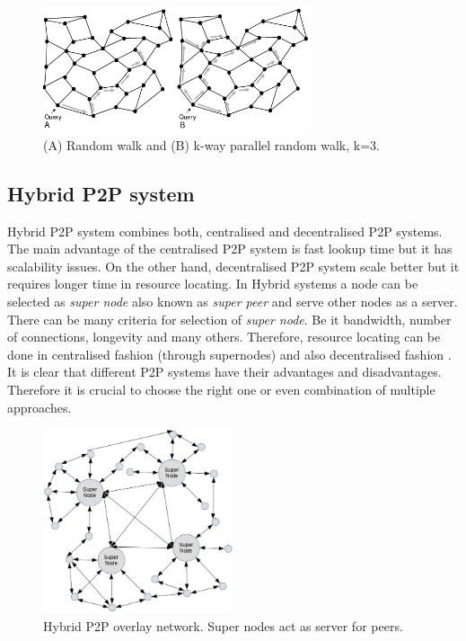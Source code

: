 \begin{figure}[ht]
	\centering
	\includegraphics[width=0.7\textwidth]{images/random-walk-graph.png}
	\caption{\label{fig:random-walk-graph}(A) Random walk and (B) k-way parallel random walk, k=3. \cite{koegel_buford_p2p_2009}}
\end{figure}

\subsection{Hybrid P2P system}
\quad Hybrid P2P system combines both, centralised and decentralised P2P systems. The main advantage of the centralised P2P system is fast lookup time but it has scalability issues. On the other hand, decentralised P2P system scale better but it requires longer time in resource locating. In Hybrid systems a node can be selected as \textit{super node} also known as \textit{super peer} and serve other nodes as a server. There can be many criteria for selection of \textit{super node}. Be it bandwidth, number of connections, longevity and many others. Therefore, resource locating can be done in centralised fashion (through supernodes) and also decentralised fashion \cite{vu_peer--peer_2010}. It is clear that different P2P systems have their advantages and disadvantages. Therefore it is crucial to choose the right one or even combination of multiple approaches.

\begin{figure}[ht]
	\centering
	\includegraphics[width=0.5\textwidth]{images/hybrid-p2p.png}
	\caption{\label{fig:hybrid-p2p} Hybrid P2P overlay network. Super nodes act as server for peers.}
\end{figure}




